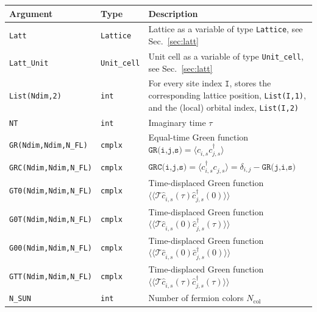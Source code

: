%
\begin{table}[h]
	\begin{center}
		\begin{tabular}{@{} p{}  p{} @{\hspace{1.5ex}} p{}  @{}}
			\toprule
			Argument                      & Type                 & Description \\
			\midrule
			\texttt{Latt}                 & \texttt{Lattice}     & Lattice as a variable of type \texttt{Lattice}, see Sec.~\ref{sec:latt}\\
			\texttt{Latt\_Unit}           & \texttt{Unit\_cell}  & Unit cell as a variable of type \texttt{Unit\_cell}, see Sec.~\ref{sec:latt}\\
			\texttt{List(Ndim,2)}         & \texttt{int}         & For every site index $\texttt{I}$, stores the corresponding lattice position, \texttt{List(I,1)}, and the (local) orbital index, \texttt{List(I,2)}\\
			\texttt{NT}                   & \texttt{int}         & Imaginary time $\tau$\\
			\texttt{GR(Ndim,Ndim,N\_FL)}  & \texttt{cmplx}       & Equal-time Green function $\texttt{GR(i,j,s)}  = \langle c^{\phantom{\dagger}}_{i,s} c^{\dagger}_{j,s}  \rangle$\\
			\texttt{GRC(Ndim,Ndim,N\_FL)} & \texttt{cmplx}       & $\texttt{GRC(i,j,s)}  = \langle c^{\dagger}_{i,s} c^{\phantom{\dagger}}_{j,s}  \rangle  =  \delta_{i,j} - \texttt{GR(j,i,s)}$\\
			\texttt{GT0(Ndim,Ndim,N\_FL)} & \texttt{cmplx}       & Time-displaced Green function $\langle \langle \mathcal{T} \hat{c}^{\phantom\dagger}_{i,s}(\tau) \hat{c}^{\dagger}_{j,s}(0) \rangle \rangle$\\
			\texttt{G0T(Ndim,Ndim,N\_FL)} & \texttt{cmplx}       & Time-displaced Green function $\langle \langle \mathcal{T} \hat{c}^{\phantom\dagger}_{i,s}(0) \hat{c}^{\dagger}_{j,s}(\tau) \rangle \rangle $\\
			\texttt{G00(Ndim,Ndim,N\_FL)} & \texttt{cmplx}       & Time-displaced Green function $\langle \langle \mathcal{T} \hat{c}^{\phantom\dagger}_{i,s}(0) \hat{c}^{\dagger}_{j,s}(0) \rangle \rangle $\\
			\texttt{GTT(Ndim,Ndim,N\_FL)} & \texttt{cmplx}       & Time-displaced Green function $\langle \langle \mathcal{T} \hat{c}^{\phantom\dagger}_{i,s}(\tau) \hat{c}^{\dagger}_{j,s}(\tau) \rangle \rangle $\\
			\texttt{N\_SUN}               & \texttt{int}         & Number of fermion colors $N_{\mathrm{col}}$\\

\end{tabular}
\end{center}
\end{table}
